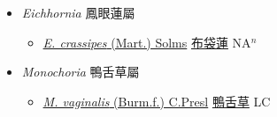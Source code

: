 
  \begin{itemize}
 \item[] \textit{Eichhornia} 鳳眼蓮屬
                    
  \begin{itemize}
        \item[] \href{http://www.theplantlist.org/tpl1.1/search?q=Eichhornia+crassipes}{\textit{E. crassipes} (Mart.) Solms}   \href{\detokenize{http://taibnet.sinica.edu.tw/chi/taibnet_species_list.php?T2=布袋蓮&T2_new_value=true&fr=y}}{布袋蓮} NA$^n$
  \end{itemize}
 \item[] \textit{Monochoria} 鴨舌草屬
                    
  \begin{itemize}
        \item[] \href{http://www.theplantlist.org/tpl1.1/search?q=Monochoria+vaginalis}{\textit{M. vaginalis} (Burm.f.) C.Presl}   \href{\detokenize{http://taibnet.sinica.edu.tw/chi/taibnet_species_list.php?T2=鴨舌草&T2_new_value=true&fr=y}}{鴨舌草} LC
  \end{itemize}
  \end{itemize}
